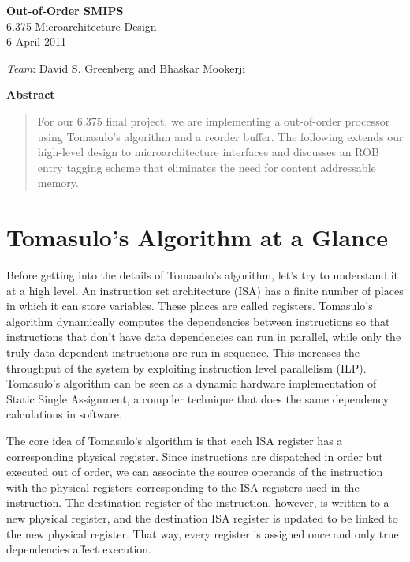 \documentclass[12pt]{article}
\begin{document}
  \begin{center}
    \textbf{\large Out-of-Order SMIPS} \\
    6.375 Microarchitecture Design\\
    6 April 2011 \\
    
    \vspace{\baselineskip}
    
    \emph{Team}: David S. Greenberg and Bhaskar Mookerji
  \end{center}
  
  \begin{center}
      \textbf{Abstract}
  \end{center}
  \begin{quotation}
      For our 6.375 final project, we are implementing a out-of-order processor using Tomasulo's algorithm and 
      a reorder buffer. The following extends our high-level design to microarchitecture interfaces and 
      discusses an ROB entry tagging scheme that eliminates the need for content addressable memory.   
      
  \end{quotation}

\section{Tomasulo's Algorithm at a Glance}

Before getting into the details of Tomasulo's algorithm, let's try to understand it at a high level. An instruction set architecture (ISA) has a finite number of places in which
it can store variables. These places are called registers. Tomasulo's algorithm dynamically computes the dependencies between instructions so that instructions that
don't have data dependencies can run in parallel, while only the truly data-dependent instructions are run in sequence. This increases the throughput of the system by exploiting
instruction level parallelism (ILP). Tomasulo's algorithm can be seen as a dynamic hardware implementation of Static Single Assignment, a compiler technique that does
the same dependency calculations in software.

The core idea of Tomasulo's algorithm is that each ISA register has a corresponding physical register. Since instructions are dispatched in order but executed out of order,
we can associate the source operands of the instruction with the physical registers corresponding to the ISA registers used in the instruction. The destination register of
the instruction, however, is written to a new physical register, and the destination ISA register is updated to be linked to the new physical register. That way, every 
register is assigned once and only true dependencies affect execution.
\end{document}
